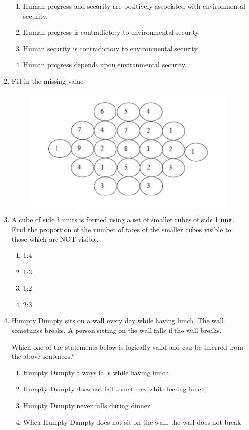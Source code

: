 \documentclass[journal,12pt,onecolumn]{IEEEtran}
\theoremstyle{remark}
\begin{document}
\begin{enumerate}
\hfill{}
\begin{enumerate}
    \item Human progress and security are positively associated with environmental security.
     \item Human progress is contradictory to environmental security
      \item Human security is contradictory to environmental security.
       \item Human progress depends upon environmental security.
\end{enumerate}

    \item Fill in the missing value

\hfill{}
\begin{figure}[H]
    \centering
    \includegraphics[width=0.5\columnwidth]{figs/8.png}
    \caption{}
    \label{fig:8}
\end{figure}

    \item A cube of side 3 units is formed using a set of smaller cubes of side 1 unit. Find the proportion of the number of faces of the smaller cubes visible to those which are NOT visible.

\hfill{}
\begin{enumerate}
    \item 1:4
     \item 1:3
      \item 1:2
       \item 2:3
\end{enumerate}

    \item Humpty Dumpty sits on a wall every day while having lunch. The wall sometimes breaks. A person sitting on the wall falls if the wall breaks. 

Which one of the statements below is logically valid and can be inferred from the above sentences?

\hfill{}
\begin{enumerate}
    \item Humpty Dumpty always falls while having lunch
     \item Humpty Dumpty does not fall sometimes while having lunch
      \item Humpty Dumpty never falls during dinner
       \item When Humpty Dumpty does not sit on the wall. the wall does not break 
\end{enumerate}


\end{enumerate}
\end{document}
